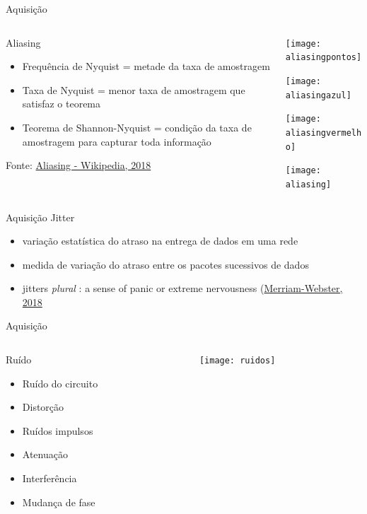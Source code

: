 \documentclass[t]{beamer}
\begin{document}
\begin{frame}[t]{Aquisição}
	\begin{columns}[T]
		\begin{column}{0.5\textwidth}
			Aliasing			
			\begin{itemize}
				\item Frequência de Nyquist = metade da taxa de amostragem
				\item Taxa de Nyquist = menor taxa de amostragem que satisfaz o teorema
				\item Teorema de Shannon-Nyquist = condição da taxa de amostragem para capturar toda informação
			\end{itemize}
		{\scriptsize Fonte: \href{https://en.wikipedia.org/wiki/Aliasing}{Aliasing - Wikipedia, 2018}}
		\end{column}
		\begin{column}{0.5\textwidth}
			\texttt{[image: aliasingpontos]}
			
			\texttt{[image: aliasingazul]}
			
			\texttt{[image: aliasingvermelho]}
			
			\texttt{[image: aliasing]}
		\end{column}
	\end{columns}
\end{frame}

\begin{frame}{Aquisição}
	Jitter
	\begin{itemize}
		\item variação estatística do atraso na entrega de dados em uma rede
		\item medida de variação do atraso entre os pacotes sucessivos de dados
		\item jitters  \textit{plural} : a sense of panic or extreme nervousness (\href{https://www.merriam-webster.com/dictionary/jitter}{Merriam-Webster, 2018}
	\end{itemize}
\end{frame}

\begin{frame}{Aquisição}
	\begin{columns}[T]
		\begin{column}{0.4\textwidth}
			Ruído
			\begin{itemize}
				\item Ruído do circuito
				\item Distorção
				\item Ruídos impulsos
				\item Atenuação
				\item Interferência
				\item Mudança de fase
			\end{itemize}
		\end{column}
		\begin{column}{0.6\textwidth}
			\texttt{[image: ruidos]}
		\end{column}
	\end{columns}
\end{frame}
\end{document}
